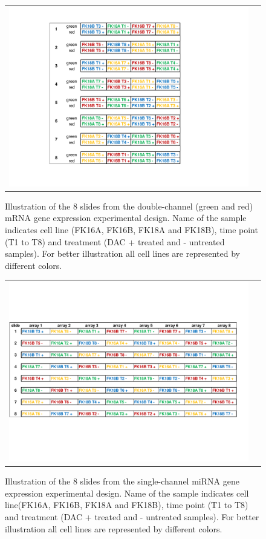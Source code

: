 \begin{figure}[h!]
\centering
\begin{tabular}{cc}
\includegraphics[scale=0.53]{mRNAdesign.pdf}
\end{tabular}
\caption{Illustration of the 8 slides from the double-channel (green and red) mRNA gene expression experimental design. Name of the sample indicates cell line (FK16A, FK16B, FK18A and FK18B), time point (T1 to T8) and treatment (DAC + treated and - untreated samples). For better illustration all cell lines are represented by different colors.}
\label{fig:experimentDesign1}
\end{figure}

\begin{figure}[h!]
\centering
\begin{tabular}{cc}
\includegraphics[scale=0.49]{miRNAdesign.pdf}
\end{tabular}
\caption{Illustration of the 8 slides from the single-channel miRNA gene expression experimental design. Name of the sample indicates cell line(FK16A, FK16B, FK18A and FK18B), time point (T1 to T8) and treatment (DAC + treated and - untreated samples). For better illustration all cell lines are represented by different colors.}
\label{fig:experimentDesign2}
\end{figure}


